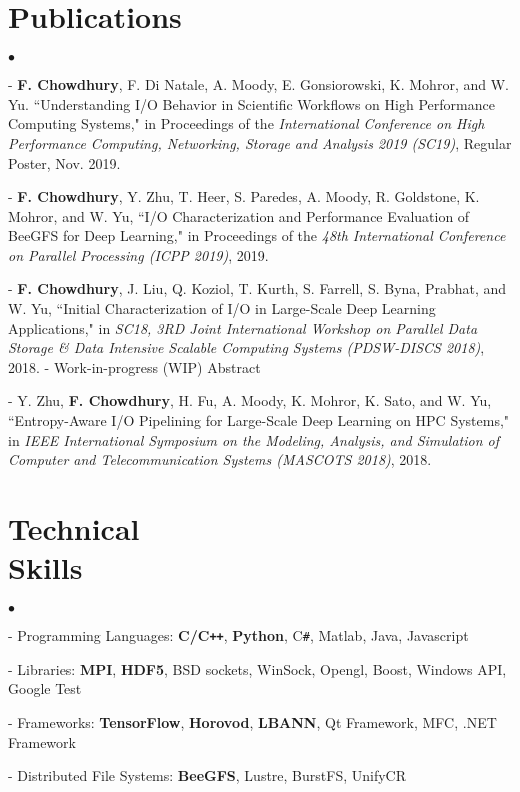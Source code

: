 \documentclass[margin,line]{res}
\newenvironment{list2}{
  \begin{list}{$\bullet$}{%
      \setlength{\itemsep}{0in}
      \setlength{\parsep}{0in} \setlength{\parskip}{0in}
      \setlength{\topsep}{0in} \setlength{\partopsep}{0in} 
      \setlength{\leftmargin}{0.2in}}}{\end{list}}
\begin{document}
\begin{resume}
\vspace*{-.1in}

\section{\sc Publications}
\begin{list2}
\item[ - ] {\bf F. Chowdhury}, F. Di Natale, A. Moody, E. Gonsiorowski, K. Mohror, and W. Yu. ``Understanding I/O Behavior in Scientific Workflows on High Performance Computing Systems," in Proceedings of the \textit{International Conference on High Performance Computing, Networking, Storage and Analysis 2019 (SC19)}, Regular Poster, Nov. 2019.
\item[ - ] {\bf F. Chowdhury}, Y. Zhu, T. Heer, S. Paredes, A. Moody, R. Goldstone, K. Mohror, and W. Yu, ``I/O Characterization and Performance Evaluation of BeeGFS for Deep Learning," in Proceedings of the \textit{48th International Conference on Parallel Processing (ICPP 2019)}, 2019.
\item[ - ] {\bf F. Chowdhury}, J. Liu, Q. Koziol, T. Kurth, S. Farrell, S. Byna, Prabhat, and W. Yu, ``Initial Characterization of I/O in Large-Scale Deep Learning Applications," in \textit{SC18, 3RD Joint International Workshop on Parallel Data Storage \& Data Intensive Scalable Computing Systems (PDSW-DISCS 2018)}, 2018. - Work-in-progress (WIP) Abstract
\item[ - ] Y. Zhu, {\bf F. Chowdhury}, H. Fu, A. Moody, K. Mohror, K. Sato, and W. Yu, ``Entropy-Aware I/O Pipelining for Large-Scale Deep Learning on HPC Systems," in \textit{IEEE International Symposium on the Modeling, Analysis, and Simulation of Computer and Telecommunication Systems (MASCOTS 2018)}, 2018.
\end{list2}

\vspace*{-.1in}

\section{\sc Technical \\Skills}
\begin{list2}
\item[ - ] Programming Languages: {\bf C/C\texttt{++}}, {\bf Python}, C\texttt{\#}, Matlab, Java, Javascript
\item[ - ] Libraries: {\bf MPI}, {\bf HDF5}, BSD sockets, WinSock, Opengl, Boost, Windows API, Google Test
\item[ - ] Frameworks: {\bf TensorFlow}, {\bf Horovod}, {\bf LBANN}, Qt Framework, MFC, .NET Framework
\item[ - ] Distributed File Systems: {\bf BeeGFS}, Lustre, BurstFS, UnifyCR
\end{list2}

\end{resume}
\end{document}
